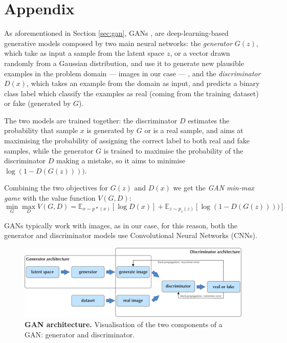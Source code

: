 \documentclass{article}
\begin{document}
	\clearpage
	\appendix
	\section{Appendix}\label{sec:appendix}
	
	As aforementioned in Section \ref{sec:gan}, GANs \cite{goodfellow2014generative}, are 
	deep-learning-based generative models composed by two main neural networks: 
	the \textit{generator} ${G(z)}$, which take as input a sample from the latent space $z$, or a vector 
	drawn randomly from a Gaussian distribution, and use it to generate new plausible examples in the 
	problem domain — images in our case — , and the \textit{discriminator} ${D(x)}$, which takes an 
	example from the domain as input, and predicts a binary class label which classify the examples as 
	real (coming from the training dataset) or fake (generated by $G$). 
	
	The two models are trained together: the discriminator $D$ estimates the probability that 
	sample $x$ is generated by $G$ or is a real sample, and aims at maximising the probability of 
	assigning the correct label to both real and fake samples, while the generator $G$ is trained to 
	maximise the probability of the discriminator $D$ making a mistake, so it aims to minimise 
	$\log(1-D(G(z))))$.
	
	Combining the two objectives for $G(z)$ and $D(x)$ we get the \textit{GAN min-max game} with the 
	value function $V(G,D)$:
	\begin{equation}
		\label{e:minmaxgame}
		\min_G \max_D V(G,D) = 
		\mathbb{E}_{x \sim p*(x)} [\log D(x)] + \mathbb E _{z \sim p_z(z)} [\log (1-D(G(z))))]
	\end{equation}
	
	GANs typically work with images, as in our case, for this reason, both the generator and 
	discriminator models use Convolutional Neural Networks (CNNs).
	\begin{figure}[htb]				
		\centering
		\includegraphics[width=.7\linewidth]{images/GAN}
		\caption{\textbf{GAN architecture.} Visualisation of the two components of a GAN: generator and 
			discriminator.}
		\label{fig:gan}
	\end{figure}
	
\end{document}
